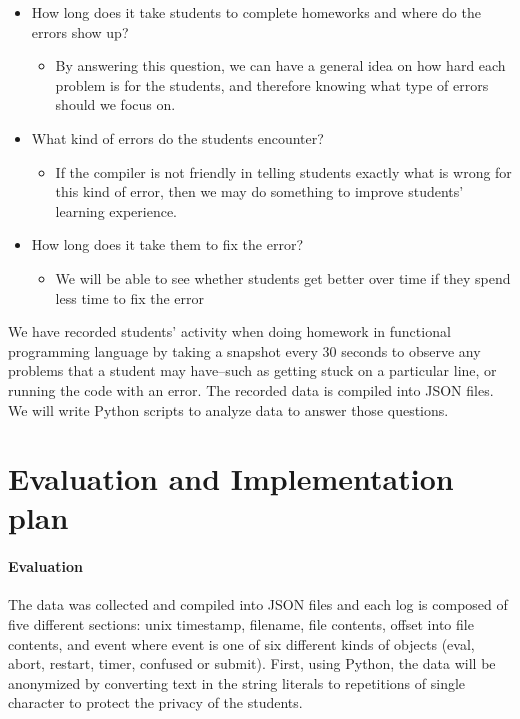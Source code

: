 \documentclass[dvips,12pt]{article}
\begin{document}
\begin{itemize}
	
	\item How long does it take students to complete homeworks and where do the errors show up? 
	
	\begin{itemize}
		\item By answering this question, we can have a general idea on how hard each problem is for the students, and therefore knowing what type of errors should we focus on.
	\end{itemize}
	
	\item What kind of errors do the students encounter?
	\begin{itemize}
		\item If the compiler is not friendly in telling students exactly what is wrong for this kind of error, then we may do something to improve students' learning experience.
	\end{itemize}
	
	\item How long does it take them to fix the error?
	\begin{itemize}
		\item We will be able to see whether students get better over time if they spend less time to fix the error
	\end{itemize}
	
\end{itemize}

We have recorded students’ activity when doing homework in functional programming language by taking a snapshot every 30 seconds to observe any problems that a student may have--such as getting stuck on a particular line, or running the code with an error. The recorded data is compiled into JSON files. We will write Python scripts to analyze data to answer those questions.


\section{Evaluation and Implementation plan}

\paragraph{Evaluation}
The data was collected and compiled into JSON files and each log is composed of five different sections: unix timestamp, filename, file contents, offset into file contents, and event where event is one of six different kinds of objects (eval, abort, restart, timer, confused or submit). First, using Python, the data will be anonymized by converting text in the string literals to repetitions of single character to protect the privacy of the students.
\end{document}
